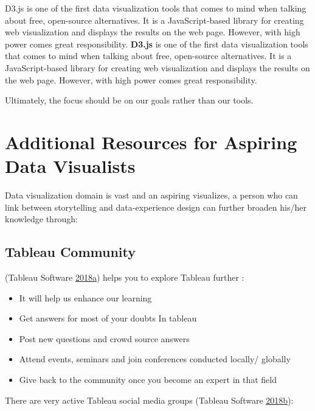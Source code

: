 \documentclass[]{book}
\providecommand{\tightlist}{%
  \setlength{\itemsep}{0pt}\setlength{\parskip}{0pt}}
\begin{document}
D3.js is one of the first data visualization tools that comes to mind when talking about free, open-source alternatives. It is a JavaScript-based library for creating web visualization and displays the results on the web page. However, with high power comes great responsibility.
\textbf{D3.js} is one of the first data visualization tools that comes to mind when talking about free, open-source alternatives. It is a JavaScript-based library for creating web visualization and displays the results on the web page. However, with high power comes great responsibility.

Ultimately, the focus should be on our goals rather than our tools.

\hypertarget{additional-resources-for-aspiring-data-visualists}{%
\section{Additional Resources for Aspiring Data Visualists}\label{additional-resources-for-aspiring-data-visualists}}

Data visualization domain is vast and an aspiring visualizes, a person who can link between storytelling and data-experience design can further broaden his/her knowledge through:

\hypertarget{tableau-community}{%
\subsection{Tableau Community}\label{tableau-community}}

(Tableau Software \protect\hyperlink{ref-Tableau_Community}{2018}\protect\hyperlink{ref-Tableau_Community}{a}) helps you to explore Tableau further :

\begin{itemize}
\tightlist
\item
  It will help us enhance our learning
\item
  Get answers for most of your doubts In tableau
\item
  Post new questions and crowd source answers
\item
  Attend events, seminars and join conferences conducted locally/ globally
\item
  Give back to the community once you become an expert in that field
\end{itemize}

There are very active Tableau social media groups (Tableau Software \protect\hyperlink{ref-LinkedIn_Groups}{2018}\protect\hyperlink{ref-LinkedIn_Groups}{b}):
\end{document}
